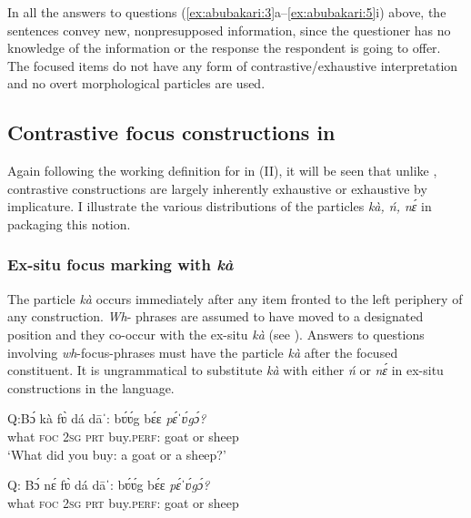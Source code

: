 \documentclass[output=paper,modfonts,nonflat,
 hidelinks
]{langsci/langscibook}
\begin{document}
In all the answers to questions (\ref{ex:abubakari:3}a--\ref{ex:abubakari:5}i) above, the sentences convey new, nonpresupposed information, since the questioner has no knowledge of the information or the response the respondent is going to offer. The focused items do not have any form of contrastive{\slash}exhaustive interpretation and no overt morphological  particles are used. 

\subsection{Contrastive focus constructions in }\label{sec:abubakari:2.2}

Again following the working definition for  in (II), it will be seen that unlike , contrastive  constructions are largely inherently exhaustive or exhaustive by implicature. I illustrate the various distributions of the particles \textit{kà, ń, nɛ́} in packaging this notion.

\subsubsection{Ex-situ focus marking with \textit{kà}}

The particle \textit{kà} occurs immediately after any item fronted to the left periphery of any construction. \textit{Wh}{}- phrases are assumed to have moved to a designated  position and they co-occur with the ex-situ  \textit{kà} (see \citealt{aboh2007}). Answers to questions involving \textit{wh}{}-focus-phrases must have the particle \textit{kà} after the focused constituent. It is ungrammatical to substitute \textit{kà} with either \textit{ń} or \textit{nɛ́} in ex-situ  constructions in the language. 

 
\ea\label{ex:abubakari:6}
\ea \label{ex:abubakari:6a} 
Q:\gll Bɔ́  kà  fʋ̀  dá  dāˈ:    bʋ́ʋ́g  bɛ́ɛ  \textit{pɛ́ˈʋ́gɔ́?}\\  
what  \textsc{foc}  2\textsc{sg}  \textsc{prt}  buy.\textsc{perf}:  goat  or 
sheep          \\
\glt ‘What did you buy: a goat or a sheep?’ 

\ex \label{ex:abubakari:6b} 
Q: \gll *Bɔ́  nɛ́  fʋ̀  dá  dāˈ:    bʋ́ʋ́g  bɛ́ɛ \textit{pɛ́ˈʋ́gɔ́?}\\
 what  \textsc{foc}  2\textsc{sg}  \textsc{prt}  buy.\textsc{perf}:  goat  or  sheep\\
  
\end{document}
